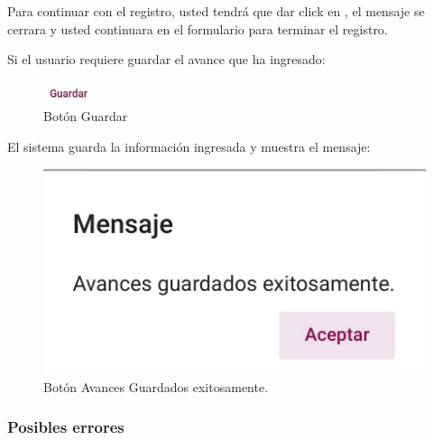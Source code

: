 \documentclass[10pt]{book}
\begin{document}
Para continuar con el registro, usted tendrá que  dar click en , el mensaje se cerrara y usted continuara 
en el formulario para terminar el registro.

\pagebreak
Si el usuario requiere guardar el avance que ha ingresado: 

\begin{figure}[!hbtp]
    \centering
    \includegraphics[width=0.1\linewidth]{images/SP6/BotonGuardar.jpeg}
    \caption{Botón Guardar} 
\end{figure}

El sistema guarda la información ingresada y muestra el mensaje: 

\begin{figure}[!hbtp]
    \centering
    \includegraphics[width=0.4\linewidth]{images/SP6/BotonAvance.jpeg}
    \caption{Botón Avances Guardados exitosamente.} 
\end{figure}

\subsubsection{Posibles errores}
\end{document}
